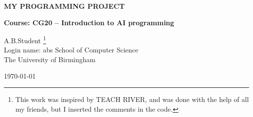 \setlength{\textwidth}{16.5cm}
\setlength{\textheight}{24.1cm}

\setlength{\topmargin}{0.1cm}
\setlength{\headheight}{0cm}
\setlength{\headsep}{0cm}

\def\sp{\vspace*{2mm}}
\def\Sp{\vspace*{3mm}}
\def\SP{\vspace*{4.5mm}}




\parskip 2mm            %
\parindent 0mm          %

\begin{center}

{\Large \bf
MY PROGRAMMING PROJECT

\Sp


\large \bf
Course: CG20 -- Introduction to AI programming

\normalsize \bf

A.B.Student \footnote{This work was inspired by TEACH RIVER, and was
done with the help of all my friends, but I
inserted the comments in the code.}
\\              %
Login name: abs
School of Computer Science \\
The University of Birmingham

\today

}

\end{center}



